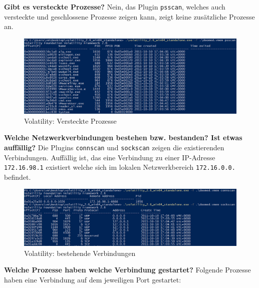 \documentclass[
    a4paper,
    pagesize,
	pdftex,
    12pt,
]{scrartcl}
\begin{document}
\textbf{Gibt es versteckte Prozesse?}
Nein, das Plugin \lstinline[breaklines]|psscan|, welches auch versteckte und geschlossene Prozesse zeigen kann, zeigt keine zusätzliche Prozesse an.
\begin{figure}[H]
	\centering
	\includegraphics[width=18cm]{vol-prozesse-verstekt.png}
	\caption{Volatility: Versteckte Prozesse}
	\label{fig:vol-prozesse-verstekt.png}
\end{figure} 
\textbf{Welche Netzwerkverbindungen bestehen bzw. bestanden? Ist etwas auffällig?}
Die Plugins \lstinline[breaklines]|connscan| und \lstinline[breaklines]|sockscan| zeigen die existierenden Verbindungen. Auffällig ist, das eine Verbindung zu einer IP-Adresse \lstinline[breaklines]|172.16.98.1| existiert welche sich im lokalen Netzwerkbereich \lstinline[breaklines]|172.16.0.0.| befindet.
\begin{figure}[H]
	\centering
	\includegraphics[width=18cm]{vol-verbindungen.png}
	\caption{Volatility: bestehende Verbindungen}
	\label{fig:vol-verbindungen.png}
\end{figure} 
\textbf{Welche Prozesse haben welche Verbindung gestartet?}
Folgende Prozesse haben eine Verbindung auf dem jeweiligen Port gestartet:
\end{document}
